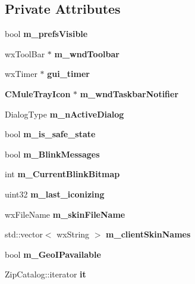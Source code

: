 \subsection*{Private Attributes}
\begin{DoxyCompactItemize}
\item 
bool {\bf m\_\-prefsVisible}\label{classCamuleDlg_af3bbc9c73c830aa7d66ac0d1eafa9088}

\item 
wxToolBar $\ast$ {\bfseries m\_\-wndToolbar}\label{classCamuleDlg_a1753b161799a5634cc61fa2a26a05097}

\item 
wxTimer $\ast$ {\bfseries gui\_\-timer}\label{classCamuleDlg_a3a61b6d03076fadcfe9bdfe394e51512}

\item 
{\bf CMuleTrayIcon} $\ast$ {\bfseries m\_\-wndTaskbarNotifier}\label{classCamuleDlg_a9d826e3315790503f9cbf57ddf9eb794}

\item 
DialogType {\bfseries m\_\-nActiveDialog}\label{classCamuleDlg_a089b44fb04272b1516e1e845945d667a}

\item 
bool {\bfseries m\_\-is\_\-safe\_\-state}\label{classCamuleDlg_a375e48a3d3d33d42b62444faed412e74}

\item 
bool {\bfseries m\_\-BlinkMessages}\label{classCamuleDlg_a79f9e0373ede81bb2ef8516eb789f5b5}

\item 
int {\bfseries m\_\-CurrentBlinkBitmap}\label{classCamuleDlg_a70a3ae008f6f6b046274489bfbcb3324}

\item 
uint32 {\bfseries m\_\-last\_\-iconizing}\label{classCamuleDlg_a7622aae398ee4fe3130b8dc3d80d8362}

\item 
wxFileName {\bfseries m\_\-skinFileName}\label{classCamuleDlg_a7620e2560d84f8638277b7552a292fca}

\item 
std::vector$<$ wxString $>$ {\bfseries m\_\-clientSkinNames}\label{classCamuleDlg_a10165f7e63b889a48aa6ec05ae9e4fad}

\item 
bool {\bfseries m\_\-GeoIPavailable}\label{classCamuleDlg_a3603a734ab3d93c855439ad6c4ccd965}

\item 
ZipCatalog::iterator {\bfseries it}\label{classCamuleDlg_a2a074d8782ace071087e8e4d945b3848}


\end{DoxyCompactItemize}
